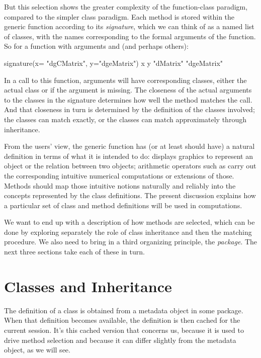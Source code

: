 \documentclass[11pt]{article}
\begin{document}
But  this selection shows  the greater complexity of the function-class paradigm, compared to the simpler class paradigm.
Each method is stored within the generic function according to its \emph{signature},  which we can think of as a named list of classes, with the names corresponding to the formal arguments of the function.  So for a function with arguments  and  (and perhaps others):
\begin{Example}
\SPrompt{}signature(x= "dgCMatrix", y="dgeMatrix")
          x           y
"dMatrix" "dgeMatrix"
\end{Example}
In a call to this function, arguments will have corresponding classes, either the actual class or  if the argument is missing.
The closeness of the actual arguments to the  classes in the signature  determines how well the method matches the call.
And that closeness in turn is determined by the definition of the classes involved; the classes can match exactly, or the classes can match approximately through inheritance.

From the users' view, the generic function has (or at least should have) a natural definition in terms of what it is intended to do:   displays graphics to represent an object or the relation between two objects; arithmetic operators such as \SOperator{+} carry out the corresponding intuitive numerical computations or extensions of those.
Methods should map those intuitive notions naturally and reliably into the concepts represented by the class definitions.
The present discussion explains how a particular set of class and method definitions will be used in computations.


We want to end up with a description of how methods are selected, which can be done by exploring separately the role of class inheritance and then the matching procedure.
We also need to bring in a third organizing principle, the \R{} \emph{package}.
The next three sections take each of these in turn.

\section{Classes and Inheritance}
\label{sec:class-defin-inher}

The definition of a class is obtained from a metadata object in some \R{} package.
When that definition becomes available, the definition is then cached for the current \R{} session.
It's this cached version that concerns us, because it is used to drive method selection and because it can differ slightly from the metadata object, as we will see.
\end{document}
